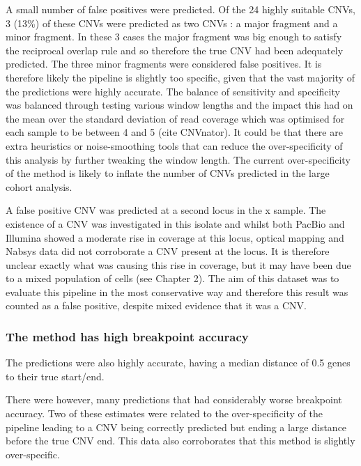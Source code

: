 \documentclass{article}
\begin{document}
A small number of false positives were predicted. Of the 24 highly suitable CNVs,  3 (13\%) of these CNVs were predicted as two CNVs : a major fragment and a minor fragment. In these 3 cases the major fragment was big enough to satisfy the reciprocal overlap rule and so therefore the true CNV had been adequately predicted. The three minor fragments were considered false positives. It is therefore likely the pipeline is slightly too specific, given that the vast majority of the predictions were highly accurate. The balance of sensitivity and specificity was balanced through testing various window lengths and the impact this had on the mean over the standard deviation of read coverage which was optimised for each sample to be between 4 and 5 (cite CNVnator). It could be that there are extra heuristics or noise-smoothing tools that can reduce the over-specificity of this analysis by further tweaking the window length.  The current over-specificity of the method is likely to inflate the number of CNVs predicted in the large cohort analysis. 


A false positive CNV was predicted at a second locus in the x sample. The existence of a CNV was investigated in this isolate and whilst both PacBio and Illumina showed a moderate rise in coverage at this locus, optical mapping and Nabsys data did not corroborate a CNV present at the locus. It is therefore unclear exactly what was causing this rise in coverage, but it may have been due to a mixed population of cells (see Chapter 2). The aim of this dataset was to evaluate this pipeline in the most conservative way and therefore this result was counted as a false positive, despite mixed evidence that it was a CNV.

\subsubsection{The method has high breakpoint accuracy}
The predictions were also highly accurate, having a median distance of 0.5 genes to their true start/end.

There were however, many predictions that had considerably worse breakpoint accuracy. Two of these estimates were related to the over-specificity of the pipeline leading to a CNV being correctly predicted but ending a large distance before the true CNV end. This data also corroborates that this method is slightly over-specific.
\end{document}
